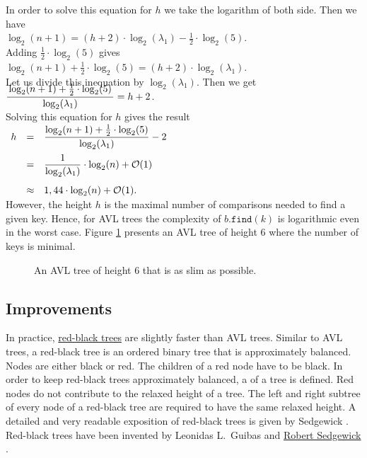In order to solve this equation for  $h$ we take the logarithm of both side.  Then we have
\\[0.2cm]
\hspace*{1.3cm}
$\log_2(n+1) = (h+2) \cdot \log_2(\lambda_1) - \frac{1}{2}\cdot \log_2(5)$.
\\[0.2cm]
Adding  $\frac{1}{2}\cdot \log_2(5)$ gives
\\[0.2cm]
\hspace*{1.3cm}
$\log_2(n+1) + \frac{1}{2}\cdot \log_2(5) = (h+2) \cdot \log_2(\lambda_1)$.
\\[0.2cm]
Let us divide this inequation by  $\log_2(\lambda_1)$.  Then we get
\\[0.4cm]
\hspace*{1.3cm}
$\ds \bruch{\log_2(n+1) + \frac{1}{2}\cdot \log_2(5)}{\log_2(\lambda_1)} = h+2$.
\\[0.2cm]
Solving this equation for  $h$ gives the result 
\\[0.4cm]
\hspace*{1.3cm} 
$
\begin{array}[t]{lcl}
h & = & \displaystyle \frac{\log_2(n+1) + \frac{1}{2}\cdot \log_2(5)}{\log_2(\lambda_1)} - 2 \\[0.4cm]
  & = & \displaystyle \frac{1}{\log_2(\lambda_1)}\cdot \log_2(n) + \mathcal{O}(1) \\[0.5cm]
  & \approx & 1,44 \cdot \log_2(n) + \mathcal{O}(1).
\end{array} 
$
\\[0.2cm]
However, the height $h$ is the maximal number of comparisons needed to find a given key.
Hence, for AVL trees the complexity of $b.\texttt{find}(k)$ is logarithmic even in the worst case.
Figure 
\ref{fig:avl-worst-case} presents an  AVL tree of height 6 where the number of keys is minimal.



\begin{figure}[!ht]
  \centering
  \caption{An AVL tree of height 6 that is as slim as possible.}
  \label{fig:avl-worst-case}
\end{figure}

\subsection{Improvements}
In practice, 
\href{https://en.wikipedia.org/wiki/Red-black_trees}{red-black trees} 
are slightly faster than \textsc{AVL} trees.  Similar to
\textsc{AVL} trees, a  red-black tree
  is an ordered binary tree that is approximately balanced.  Nodes are either black or red.
The children of a red node have to be black.  In order to keep red-black trees approximately
balanced, a  of a tree is defined.  Red nodes do not contribute to the relaxed
height of a tree.  The left and right subtree of every node of a red-black tree are required to have the same 
relaxed height.  A detailed and very readable exposition of red-black trees is given by Sedgewick
\cite{sedgewick:2011}.  Red-black trees have been invented by Leonidas L.~Guibas and 
\href{https://en.wikipedia.org/wiki/Robert_Sedgewick_(computer_scientist)}{Robert Sedgewick} \cite{guibas:78}.

